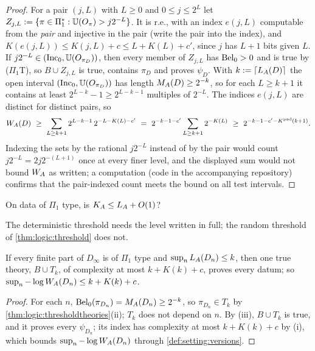 \begin{proof}
For a pair $(j,L)$ with $L\ge0$ and $0\le j\le2^L$ let $Z_{j,L}:=\{\pi\in\Pi_1^*:\mathbb{U}(O_\pi)>j2^{-L}\}$. It is r.e., with an index $e(j,L)$ computable from the \emph{pair} and injective in the pair (write the pair into the index), and $K(e(j,L))\le K(j,L)+c\le L+K(L)+c'$, since $j$ has $L+1$ bits given $L$. If $j2^{-L}\in(\mathrm{Inc}_0,\mathbb{U}(O_{\pi_D}))$, then every member of $Z_{j,L}$ has $\mathrm{Bel}_0>0$ and is true by ($\Pi_1$T), so $B\cup Z_{j,L}$ is true, contains $\pi_D$ and proves $\psi_D$. With $k:=\lceil L_{A}(D)\rceil$ the open interval $(\mathrm{Inc}_0,\mathbb{U}(O_{\pi_D}))$ has length $M_{A}(D)\ge2^{-k}$, so for each $L\ge k+1$ it contains at least $2^{L-k}-1\ge2^{L-k-1}$ multiples of $2^{-L}$. The indices $e(j,L)$ are distinct for distinct pairs, so
\[
\WA(D)\ \ge\ \sum_{L\ge k+1}2^{L-k-1}\,2^{-L-K(L)-c'}\ =\ 2^{-k-1-c'}\sum_{L\ge k+1}2^{-K(L)}\ \ge\ 2^{-k-1-c'-\Kpad(k+1)}.
\]
Indexing the sets by the rational $j2^{-L}$ instead of by the pair would count $j2^{-L}=2j2^{-(L+1)}$ once at every finer level, and the displayed sum would not bound $W_{A}$ as written; a computation (code in the accompanying repository) confirms that the pair-indexed count meets the bound on all test intervals.
\end{proof}

\begin{question}\label{q:logic:codingO1}
On data of $\Pi_1$ type, is $K_{A}\le L_{A}+O(1)$?
\end{question}

The deterministic threshold needs the level written in full; the random threshold of \cref{thm:logic:threshold} does not.

\begin{corollary}\label{cor:logic:onetrue}
If every finite part of $D_\infty$ is of $\Pi_1$ type and $\sup_nL_{A}(D_n)\le k$, then one true theory, $B\cup T_k$, of complexity at most $k+K(k)+c$, proves every datum; so $\sup_n-\log W_{A}(D_n)\le k+K(k)+c$.
\end{corollary}

\begin{proof}
For each $n$, $\mathrm{Bel}_0(\pi_{D_n})=M_{A}(D_n)\ge2^{-k}$, so $\pi_{D_n}\in T_k$ by \cref{thm:logic:thresholdtheories}(ii); $T_k$ does not depend on $n$. By (iii), $B\cup T_k$ is true, and it proves every $\psi_{D_n}$; its index has complexity at most $k+K(k)+c$ by (i), which bounds $\sup_n-\log W_{A}(D_n)$ through \cref{def:setting:versions}.
\end{proof}

